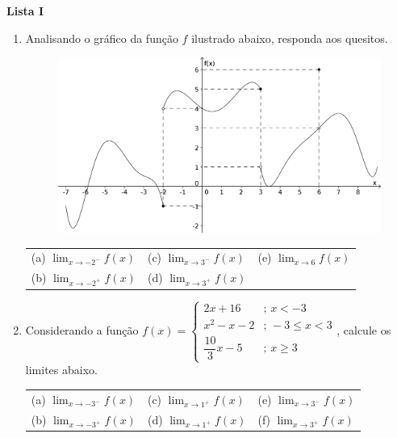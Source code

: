 \documentclass[12pt,a4paper]{article}
\begin{document}
\begin{center}
  \textbf{Lista I}
\end{center}

\begin{enumerate}
  \item Analisando o gráfico da função $f$ ilustrado abaixo, responda aos quesitos.

  \begin{figure}[!tbh]
    \centering
    \includegraphics[scale=0.8]{imagem/grafico-lista2-questao1}
  \end{figure}

  \begin{tabular}{lll}
    (a) ${\displaystyle \lim_{x\to-2^{-}}f(x)}$ & (c) ${\displaystyle \lim_{x\to3^{-}}f(x)}$ & (e) ${\displaystyle \lim_{x\to6}f(x)}$ \\
    (b) ${\displaystyle \lim_{x\to-2^{+}}f(x)}$ & (d) ${\displaystyle \lim_{x\to3^{+}}f(x)}$ &
  \end{tabular}

  \item Considerando a função 
    $f(x)=\begin{cases}
      2x+16 & ;\, x<-3\\
      x^{2}-x-2 & ;\,-3\leq x<3\\
      \dfrac{10}{3}x-5 & ;\, x\geq3
    \end{cases}$, calcule os limites abaixo.

    \begin{tabular}{lll}
      (a) ${\displaystyle \lim_{x\to-3^{-}}f(x)}$ & (c) ${\displaystyle \lim_{x\to 1^{+}}f(x)}$ & (e) ${\displaystyle \lim_{x\to3^{-}}f(x)}$ \\
      (b) ${\displaystyle \lim_{x\to-3^{+}}f(x)}$ & (d) ${\displaystyle \lim_{x\to 1^{+}}f(x)}$ & (f) ${\displaystyle \lim_{x\to3^{+}}f(x)}$
    \end{tabular}


\end{enumerate}
\end{document}
